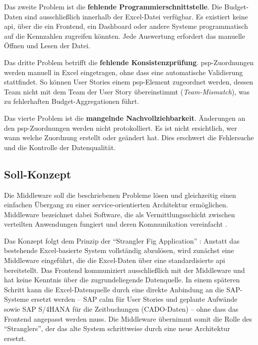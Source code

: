 Das zweite Problem ist die \textbf{fehlende Programmierschnittstelle}. Die Budget-Daten sind ausschließlich innerhalb der Excel-Datei verfügbar. Es existiert keine \gls{api}, über die ein Frontend, ein Dashboard oder andere Systeme programmatisch auf die Kennzahlen zugreifen könnten. Jede Auswertung erfordert das manuelle Öffnen und Lesen der Datei.

Das dritte Problem betrifft die \textbf{fehlende Konsistenzprüfung}. \gls{psp}-Zuordnungen werden manuell in Excel eingetragen, ohne dass eine automatische Validierung stattfindet. So können User Stories einem \gls{psp}-Element zugeordnet werden, dessen Team nicht mit dem Team der User Story übereinstimmt (\textit{Team-Mismatch}), was zu fehlerhaften Budget-Aggregationen führt.

Das vierte Problem ist die \textbf{mangelnde Nachvollziehbarkeit}. Änderungen an den \gls{psp}-Zuordnungen werden nicht protokolliert. Es ist nicht ersichtlich, wer wann welche Zuordnung erstellt oder geändert hat. Dies erschwert die Fehlersuche und die Kontrolle der Datenqualität.

\subsection{Soll-Konzept}

Die Middleware soll die beschriebenen Probleme lösen und gleichzeitig einen einfachen Übergang zu einer service-orientierten Architektur ermöglichen. Middleware bezeichnet dabei Software, die als Vermittlungsschicht zwischen verteilten Anwendungen fungiert und deren Kommunikation vereinfacht \citep{bernstein1996, tanenbaum2017}.

Das Konzept folgt dem Prinzip der \enquote{Strangler Fig Application} \citep{newman2021}: Anstatt das bestehende Excel-basierte System vollständig abzulösen, wird zunächst eine Middleware eingeführt, die die Excel-Daten über eine standardisierte \gls{api} bereitstellt. Das Frontend kommuniziert ausschließlich mit der Middleware und hat keine Kenntnis über die zugrundeliegende Datenquelle. In einem späteren Schritt kann die Excel-Datenquelle durch eine direkte Anbindung an die SAP-Systeme ersetzt werden -- SAP \gls{calm} für User Stories und geplante Aufwände sowie SAP S/4HANA für die Zeitbuchungen (CADO-Daten) -- ohne dass das Frontend angepasst werden muss. Die Middleware übernimmt somit die Rolle des \enquote{Stranglers}, der das alte System schrittweise durch eine neue Architektur ersetzt.

